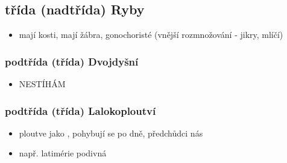 \documentclass{article}
\begin{document}
\subsection{třída (nadtřída) Ryby}
\begin{itemize}
  \item mají kosti, mají žábra, gonochoristé (vnější rozmnožování - jikry, mlíčí)
\end{itemize}

\subsubsection{podtřída (třída) Dvojdyšní}
\begin{itemize}
  \item NESTÍHÁM
\end{itemize}

\subsubsection{podtřída (třída) Lalokoploutví}
\begin{itemize}
  \item ploutve jako , pohybují se po dně, předchůdci nás
  \item např. latimérie podivná
\end{itemize}
\end{document}
